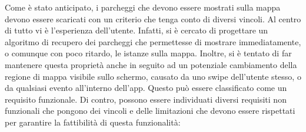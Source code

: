 Come è stato anticipato, i parcheggi che devono essere mostrati sulla mappa devono essere 
scaricati con un criterio che tenga conto di diversi vincoli. Al centro di tutto vi è
l'esperienza dell'utente. Infatti, si è cercato di progettare un algoritmo di recupero dei 
parcheggi che permettesse di mostrare immediatamente, o comunque con poco ritardo, le 
istanze sulla mappa. Inoltre, si è tentato di far mantenere questa proprietà anche in seguito
ad un potenziale cambiamento della regione di mappa visibile sullo schermo, causato da uno
swipe dell'utente stesso, o da qualsiasi evento all'interno dell'app. Questo può essere
classificato come un requisito funzionale. Di contro, possono essere individuati diversi
requisiti non funzionali che pongono dei vincoli e delle limitazioni che devono essere 
rispettati per garantire la fattibilità di questa funzionalità:
